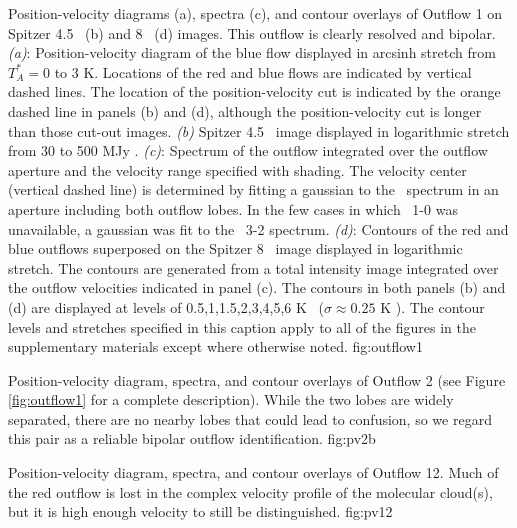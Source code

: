 {Position-velocity diagrams (a), spectra (c), and contour overlays of Outflow 1 on Spitzer 4.5 \um\ (b)
and 8 \um\ (d) images.  
This outflow is clearly resolved and bipolar.
{\it (a)}: Position-velocity diagram of the blue flow displayed in arcsinh stretch
from $T_A^*=$0 to 3 K.  Locations of the red and blue flows are indicated by vertical dashed lines.
The location of the position-velocity cut is indicated by the orange dashed line in panels (b) and
(d), although the position-velocity cut is longer than those cut-out images.
{\it (b)} Spitzer 4.5 \um\ image displayed in logarithmic stretch from 30 to 500 MJy \persr.    
{\it (c)}: Spectrum of
the outflow integrated over the outflow aperture and the velocity range
specified with shading.  The velocity center (vertical dashed line) is
determined by fitting a gaussian to the \thirteenco\ spectrum in an aperture
including both outflow lobes.  In the few cases in which \thirteenco\ 1-0 was 
unavailable, a gaussian was fit to the \twelveco\ 3-2 spectrum.
{\it (d)}: Contours of the red and blue outflows superposed on the 
Spitzer 8 \um\ image displayed in logarithmic stretch.  The contours are
generated from a total intensity image integrated over the outflow
velocities indicated in panel (c).  The contours in both panels (b) and (d) are displayed at levels of
0.5,1,1.5,2,3,4,5,6 K \kms\ ($\sigma\approx0.25$ K \kms).
The contour levels and stretches specified in this caption apply to all of the
figures in the supplementary materials except where otherwise noted.
}
{fig:outflow1}


{Position-velocity diagram, spectra, and contour overlays of Outflow 2 (see
Figure \ref{fig:outflow1} for a complete description).  While the two lobes are
widely separated, there are no nearby lobes that could lead to confusion, so we
regard this pair as a reliable bipolar outflow identification.  
}
{fig:pv2b}

{Position-velocity diagram, spectra, and contour overlays of Outflow 12.  Much of the red outflow
is lost in the complex velocity profile of the molecular cloud(s), but it is high enough velocity
to still be distinguished. }
{fig:pv12}

